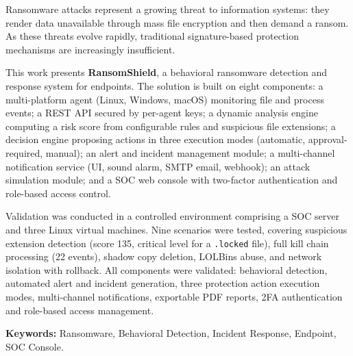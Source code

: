 Ransomware attacks represent a growing threat to information systems: they render data unavailable through mass file encryption and then demand a ransom. As these threats evolve rapidly, traditional signature-based protection mechanisms are increasingly insufficient.

This work presents \textbf{RansomShield}, a behavioral ransomware detection and response system for endpoints. The solution is built on eight components: a multi-platform agent (Linux, Windows, macOS) monitoring file and process events; a REST API secured by per-agent keys; a dynamic analysis engine computing a risk score from configurable rules and suspicious file extensions; a decision engine proposing actions in three execution modes (automatic, approval-required, manual); an alert and incident management module; a multi-channel notification service (UI, sound alarm, SMTP email, webhook); an attack simulation module; and a SOC web console with two-factor authentication and role-based access control.

Validation was conducted in a controlled environment comprising a SOC server and three Linux virtual machines. Nine scenarios were tested, covering suspicious extension detection (score 135, critical level for a \texttt{.locked} file), full kill chain processing (22 events), shadow copy deletion, LOLBins abuse, and network isolation with rollback. All components were validated: behavioral detection, automated alert and incident generation, three protection action execution modes, multi-channel notifications, exportable PDF reports, 2FA authentication and role-based access management.

\textbf{Keywords:} Ransomware, Behavioral Detection, Incident Response, Endpoint, SOC Console.
